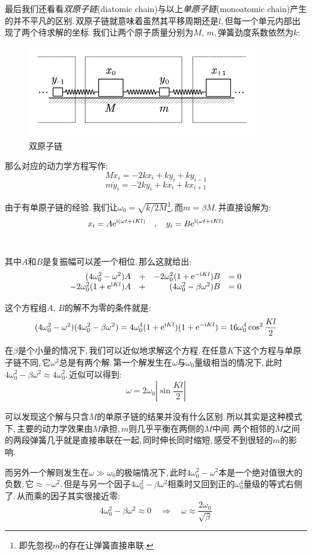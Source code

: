 最后我们还看看\emph{双原子链}(diatomic chain)与以上\emph{单原子链}(monoatomic chain)产生的并不平凡的区别.\,双原子链就意味着虽然其平移周期还是$l$,\,但每一个单元内部出现了两个待求解的坐标.\,我们让两个原子质量分别为$M,\,m$,\,弹簧劲度系数依然为$k$:
\begin{figure}[H]
\centering
\includegraphics[width=10cm]{image/6-3-15.png}
\caption{双原子链}
\end{figure}

那么对应的动力学方程写作:
\[M\ddot{x}_i=-2kx_i+ky_i+ky_{i-1}\]
\[m\ddot{y}_i=-2ky_i+kx_i+kx_{i+1}\]

由于有单原子链的经验.\,我们让$\omega_0=\sqrt{k/2M}$\footnote{即先忽视$m$的存在让弹簧直接串联.},\,而$m=\beta M$.\,并直接设解为:
\[x_i=A{\rm e}^{{\rm i}(\omega t+iKl)}\quad,\quad y_i=B{\rm e}^{{\rm i}(\omega t+iKl)}\]\

其中$A$和$B$是复振幅可以差一个相位.\,那么这就给出:
\[
\begin{array}{rcrc}
(4\omega_0^2-\omega^2)A&+&-2\omega_0^2(1+{\rm e}^{-{\rm i} Kl})B&=0\\
-2\omega_0^2(1+{\rm e}^{{\rm i} Kl})A&+&(4\omega_0^2-\beta\omega^2)B&=0
\end{array}
\]

这个方程组$A,\,B$的解不为零的条件就是:
\[(4\omega_0^2-\omega^2)(4\omega_0^2-\beta\omega^2)=4\omega_0^4(1+{\rm e}^{{\rm i} Kl})(1+{\rm e}^{-{\rm i} Kl})=16\omega_0^4\cos^2\frac{Kl}{2}\]

在$\beta$是个小量的情况下,\,我们可以近似地求解这个方程.\,在任意$K$下这个方程与单原子链不同,\,它$\omega^2$总是有两个解.\,第一个解发生在$\omega$与$\omega_0$量级相当的情况下,\,此时$4\omega_0^2-\beta\omega^2\approx 4\omega_0^2$.\,近似可以得到:
\[\omega=2\omega_0\left|\sin{\frac{Kl}{2}}\right|\]

可以发现这个解与只含$M$的单原子链的结果并没有什么区别.\,所以其实是这种模式下,\,主要的动力学效果由$M$承担,\,$m$则几乎平衡在两侧的$M$中间.\,两个相邻的$M$之间的两段弹簧几乎就是直接串联在一起,\,同时伸长同时缩短,\,感受不到很轻的$m$的影响.

而另外一个解则发生在$\omega\gg \omega_0$的极端情况下,\,此时$4\omega_0^2-\omega^2$本是一个绝对值很大的负数,\,它$\approx -\omega^2$.\,但是与另一个因子$4\omega_0^2-\beta\omega^2$相乘时又回到正的$\omega_0^4$量级的等式右侧了.\,从而乘的因子其实很接近零:
\[4\omega_0^2-\beta\omega^2\approx 0\quad\Rightarrow \quad \omega\approx \frac{2\omega_0}{\sqrt{\beta}}\]


